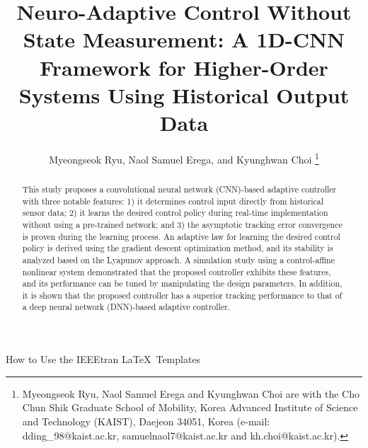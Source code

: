 \documentclass[letterpaper, journal]{IEEEtran}
\begin{document}

\title{
  Neuro-Adaptive Control Without State Measurement: A 1D-CNN Framework for Higher-Order Systems Using Historical Output Data
} %

\author{
  Myeongseok Ryu, Naol Samuel Erega, and Kyunghwan Choi
\thanks{
  Myeongseok Ryu, Naol Samuel Erega and Kyunghwan Choi are with the Cho Chun Shik Graduate School of Mobility, Korea Advanced Institute of Science and Technology (KAIST), Daejeon 34051, Korea (e-mail: dding\_98@kaist.ac.kr, samuelnaol7@kaist.ac.kr and kh.choi@kaist.ac.kr).

  }
}

%
{How to Use the IEEEtran \LaTeX \ Templates}

\maketitle


\begin{abstract}
  This study proposes a convolutional neural network (CNN)-based adaptive controller with three notable features: 1) it determines control input directly from historical sensor data; 2) it learns the desired control policy during real-time implementation without using a pre-trained network; and 3) the asymptotic tracking error convergence is proven during the learning process. 
  An adaptive law for learning the desired control policy is derived using the gradient descent optimization method, and its stability is analyzed based on the Lyapunov approach. 
  A simulation study using a control-affine nonlinear system demonstrated that the proposed controller exhibits these features, and its performance can be tuned by manipulating the design parameters. 
  In addition, it is shown that the proposed controller has a superior tracking performance to that of a deep neural network (DNN)-based adaptive controller.    
\end{abstract}
\end{document}
